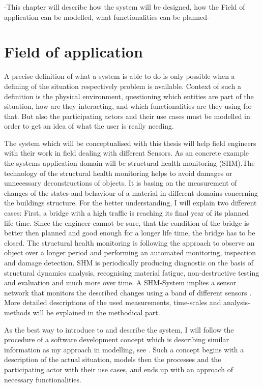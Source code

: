 -This chapter will describe how the system will be designed, how the Field of application can be modelled, what functionalities can be planned-

\section{Field of application}
A precise definition of what a system is able to do is only possible when a defining of the situation respectively problem is available. Context of such a definition is the physical environment, questioning which entities are part of the situation, how are they interacting, and which functionalities are they using for that. But also the participating actors and their use cases must be modelled in order to get an idea of what the user is really needing.

The system which will be conceptualised with this thesis will help field engineers with their work in field dealing with different Sensors. As an concrete example the systems application domain will be structural health monitoring (SHM).The technology of the structural health monitoring helps to avoid damages or unnecessary deconstructions of objects. It is basing on the measurement of changes of the states and behaviour of a material in different domains concerning the buildings structure. For the better understanding, I will explain two different cases: First, a bridge with a high traffic is reaching its final year of its planned life time. Since the engineer cannot be sure, that the condition of the bridge is better then planned and good enough for a longer life time, the bridge has to be closed. The structural health monitoring is following the approach to observe an object over a longer period and performing an automated monitoring, inspection and damage detection. SHM is periodically producing diagnostic on the basis of structural dynamics analysis, recognising material fatigue, non-destructive testing and evaluation and much more over time. A SHM-System implies a sensor network that monitors the described changes using a band of different sensors \citep{worden_overview_2004} \citep{farrar_introduction_2007} \citep{boller_structural_2004}. More detailed descriptions of the used measurements, time-scales and analysis-methods will be explained in the methodical part.

As the best way to introduce to and describe the system, I will follow the procedure of a software development concept which is describing similar information as my approach in modelling, see \citep{gregor_engels_vorlesung_2006}. Such a concept begins with a description of the actual situation, models then the processes and the participating actor with their use cases, and ends up with an approach of necessary functionalities.

